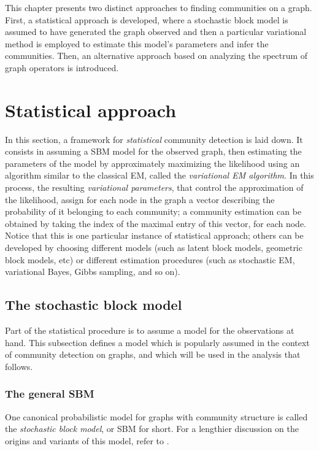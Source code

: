 \documentclass[../../main.tex]{subfiles} %
\begin{document}
This chapter presents two distinct approaches to finding communities on a 
graph. First, a statistical approach is developed, where a stochastic block model 
is assumed to have generated the graph observed and then a particular 
variational method is employed to estimate this model's parameters and infer 
the communities. Then, an alternative approach based on analyzing the 
spectrum of graph operators is introduced. 

\section{Statistical approach}
In this section, a framework for \textit{statistical} community detection is laid 
down. It consists in assuming a SBM model for the observed graph, then 
estimating the parameters of the model by approximately maximizing the 
likelihood using an algorithm similar to the classical EM, called the 
\textit{variational EM algorithm}. In this process, the resulting 
\textit{variational 
parameters}, that control the approximation of the likelihood, assign 
for each 
node in the graph a vector describing the probability of it belonging 
to each 
community; a community estimation can be obtained by taking the 
index of the 
maximal entry of this vector, for each node. Notice that this is one 
particular 
instance of statistical approach; others can be developed by choosing 
different 
models (such as latent block models, geometric block models, etc) or 
different 
estimation procedures (such as stochastic EM, variational Bayes, 
Gibbs 
sampling, and so on).

\subsection{The stochastic block model}
Part of the statistical procedure is to assume a model for the observations at 
hand. This subsection defines a model which is popularly assumed in the 
context of community detection on graphs, and which will be used in the 
analysis that follows.

\subsubsection{The general SBM}
One canonical probabilistic model for graphs with community structure is 
called 
the \textit{stochastic block model}, or SBM for short. For a lengthier 
discussion 
on the origins and variants of this model, refer to 
\cite{abbe_community_2017}. 
\end{document}
